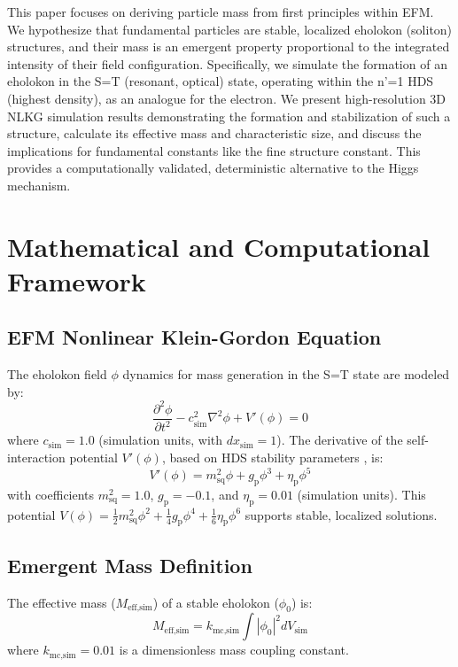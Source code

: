 \documentclass[11pt]{article}
\begin{document}
This paper focuses on deriving particle mass from first principles within EFM. We hypothesize that fundamental particles are stable, localized eholokon (soliton) structures, and their mass is an emergent property proportional to the integrated intensity of their field configuration. Specifically, we simulate the formation of an eholokon in the S=T (resonant, optical) state, operating within the n'=1 HDS (highest density), as an analogue for the electron. We present high-resolution 3D NLKG simulation results demonstrating the formation and stabilization of such a structure, calculate its effective mass and characteristic size, and discuss the implications for fundamental constants like the fine structure constant. This provides a computationally validated, deterministic alternative to the Higgs mechanism.

\section{Mathematical and Computational Framework}

\subsection{EFM Nonlinear Klein-Gordon Equation}
The eholokon field \(\phi\) dynamics for mass generation in the S=T state are modeled by:
\begin{equation}
\frac{\partial^2 \phi}{\partial t^2} - c_{\text{sim}}^2 \nabla^2 \phi + V'(\phi) = 0
\label{eq:nlkg_massgen}
\end{equation}
where \(c_{\text{sim}}=1.0\) (simulation units, with \(dx_{\text{sim}}=1\)). The derivative of the self-interaction potential \(V'(\phi)\), based on HDS stability parameters \citep{emvula2025efm_hds_validated}, is:
\begin{equation}
V'(\phi) = m_{\text{sq}}^2 \phi + g_{\text{p}} \phi^3 + \eta_{\text{p}} \phi^5
\label{eq:potential_derivative}
\end{equation}
with coefficients \(m_{\text{sq}}^2 = 1.0\), \(g_{\text{p}} = -0.1\), and \(\eta_{\text{p}} = 0.01\) (simulation units). This potential \(V(\phi) = \frac{1}{2}m_{\text{sq}}^2\phi^2 + \frac{1}{4}g_{\text{p}}\phi^4 + \frac{1}{6}\eta_{\text{p}}\phi^6\) supports stable, localized solutions.

\subsection{Emergent Mass Definition}
The effective mass (\(M_{\text{eff,sim}}\)) of a stable eholokon (\(\phi_0\)) is:
\begin{equation}
M_{\text{eff,sim}} = k_{\text{mc,sim}} \int |\phi_0|^2 dV_{\text{sim}}
\label{eq:mass_definition}
\end{equation}
where \(k_{\text{mc,sim}} = 0.01\) is a dimensionless mass coupling constant.
\end{document}

